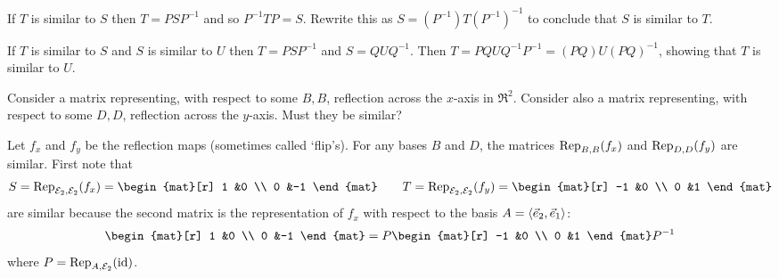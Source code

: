 \begin{exercises}
\begin{answer}
       If \( T \) is similar to \( S \) then \( T=PSP^{-1} \)
       and so \( P^{-1}TP=S \).
       Rewrite this as \( S=(P^{-1})T(P^{-1})^{-1} \) to conclude that
       $S$ is similar to \( T \).

       If \( T \) is similar to \( S \) and \( S \) is similar to \( U \)
       then \( T=PSP^{-1} \) and \( S=QUQ^{-1} \).
       Then \( T=PQUQ^{-1}P^{-1}=(PQ)U(PQ)^{-1} \), showing that \( T \)
       is similar to \( U \).  
     \end{answer}
  \item 
     Consider a 
     matrix representing, with respect to some $B,B$, 
     reflection across the \( x \)-axis in \( \Re^2 \).
     Consider also  
     a matrix representing, with respect to some $D,D$,
     reflection across the \( y \)-axis.
     Must they be similar?
     \begin{answer}
        Let $f_x$ and $f_y$ be the reflection maps (sometimes called `flip's).
        For any bases
        \( B \) and \( D \), the matrices \( \rep{f_x}{B,B}  \) and
        \( \rep{f_y}{D,D} \) are similar.
        First note that
        \begin{equation*}
           S=\rep{f_x}{\stdbasis_2,\stdbasis_2}=
           \begin{mat}[r]
              1  &0  \\
              0  &-1
           \end{mat}
           \qquad
           T=\rep{f_y}{\stdbasis_2,\stdbasis_2}=
           \begin{mat}[r]
             -1  &0  \\
              0  &1
           \end{mat}
        \end{equation*}
        are similar because the second matrix is the representation of $f_x$
        with respect to the basis \( A=\sequence{\vec{e}_2,\vec{e}_1} \):
        \begin{equation*}
           \begin{mat}[r]
              1  &0  \\
              0  &-1
           \end{mat}
           =    
           P
           \begin{mat}[r]
             -1  &0  \\
              0  &1
           \end{mat}
           P^{-1}
        \end{equation*}
        where $P=\rep{\identity}{A,\stdbasis_2}$.

\end{answer}
\end{exercises}
